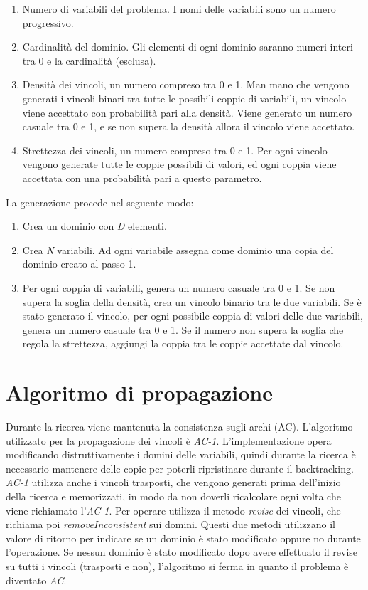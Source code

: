 \documentclass[a4paper,12pt,italian]{article}
\begin{document}
\begin{enumerate}
\item Numero di variabili del problema. I nomi delle variabili sono un
  numero progressivo.
\item Cardinalit\`a del dominio. Gli elementi di ogni dominio saranno
  numeri interi tra 0 e la cardinalit\`a (esclusa).
\item Densit\`a dei vincoli, un numero compreso tra 0 e 1. Man mano che vengono generati i vincoli
  binari tra tutte le possibili coppie di variabili, un vincolo viene accettato
  con probabilit\`a pari alla densit\`a. Viene generato un numero
  casuale tra 0 e 1, e se non supera la densit\`a allora il vincolo
  viene accettato.
\item Strettezza dei vincoli, un numero compreso tra 0 e 1. Per ogni
  vincolo vengono generate tutte le coppie possibili di valori, ed
  ogni coppia viene accettata con una probabilit\`a pari a questo parametro.
\end{enumerate}

La generazione procede nel seguente modo:
\begin{enumerate}
\item Crea un dominio con \textit{D} elementi.
\item Crea \textit{N} variabili. Ad ogni variabile assegna come
  dominio una copia del dominio creato al passo 1.
\item Per ogni coppia di variabili, genera un numero casuale tra 0 e
  1. Se non supera la soglia della densit\`a, crea un vincolo binario
  tra le due variabili. Se \`e stato generato il vincolo, per ogni
  possibile coppia di valori delle due variabili, genera un numero
  casuale tra 0 e 1. Se il numero non supera la soglia che regola
  la strettezza, aggiungi
  la coppia tra le coppie accettate dal vincolo.
\end{enumerate}

\section{Algoritmo di propagazione}

Durante la ricerca viene mantenuta la consistenza sugli archi
(AC). L'algoritmo utilizzato per la propagazione dei vincoli \`e
\textit{AC-1}. L'implementazione opera modificando distruttivamente i
domini delle variabili, quindi durante la ricerca \`e necessario
mantenere delle copie per poterli ripristinare durante il
backtracking. \textit{AC-1} utilizza anche i vincoli trasposti, che
vengono generati prima dell'inizio della ricerca e memorizzati, in
modo da non doverli ricalcolare ogni volta che viene richiamato l'\textit{AC-1}.
Per operare utilizza il metodo \textit{revise} dei vincoli, che
richiama poi \textit{removeInconsistent} sui domini. Questi due metodi
utilizzano il valore di ritorno per indicare se un dominio \`e stato
modificato oppure no durante l'operazione. Se nessun dominio \`e stato modificato dopo
avere effettuato il revise su tutti i vincoli (trasposti e non),
l'algoritmo si ferma in quanto il problema \`e diventato \textit{AC}.
\end{document}

